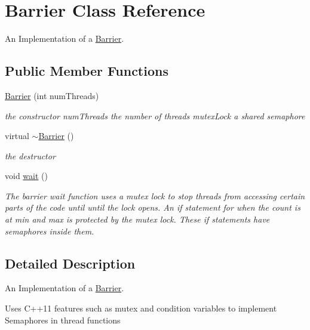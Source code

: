 \hypertarget{class_barrier}{}\section{Barrier Class Reference}
\label{class_barrier}


An Implementation of a \hyperlink{class_barrier}{Barrier}.  


\subsection*{Public Member Functions}
\begin{DoxyCompactItemize}
\item 
\hyperlink{class_barrier_a7290fb8952d0f7779b8d6a7a34bbd407}{Barrier} (int num\+Threads)
\begin{DoxyCompactList}\small\item\em the constructor  num\+Threads the number of threads  mutex\+Lock a shared semaphore \end{DoxyCompactList}\item 
\mbox{\label{class_barrier_a401f40e73302009b305904ffc7825304}} 
virtual \hyperlink{class_barrier_a401f40e73302009b305904ffc7825304}{$\sim$\+Barrier} ()
\begin{DoxyCompactList}\small\item\em the destructor \end{DoxyCompactList}\item 
void \hyperlink{class_barrier_a83a9d2e85e98b3d2081538bf0da29b60}{wait} ()
\begin{DoxyCompactList}\small\item\em The barrier wait function uses a mutex lock to stop threads from accessing certain parts of the code until until the lock opens. An if statement for when the count is at min and max is protected by the mutex lock. These if statements have semaphores inside them. \end{DoxyCompactList}\end{DoxyCompactItemize}


\subsection{Detailed Description}
An Implementation of a \hyperlink{class_barrier}{Barrier}. 

Uses C++11 features such as mutex and condition variables to implement Semaphores in thread functions 

